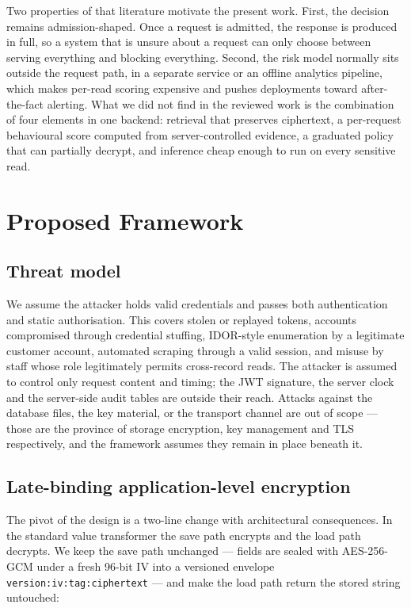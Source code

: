 \documentclass[a4paper,conference]{IEEEtran}
\begin{document}
Two properties of that literature motivate the present work. First, the decision remains
admission-shaped. Once a request is admitted, the response is produced in full, so a system that
is unsure about a request can only choose between serving everything and blocking everything.
Second, the risk model normally sits outside the request path, in a separate service or an
offline analytics pipeline, which makes per-read scoring expensive and pushes deployments toward
after-the-fact alerting. What we did not find in the reviewed work is the combination of four
elements in one backend: retrieval that preserves ciphertext, a per-request behavioural score
computed from server-controlled evidence, a graduated policy that can partially decrypt, and
inference cheap enough to run on every sensitive read.

\section{Proposed Framework}

\subsection{Threat model}

We assume the attacker holds valid credentials and passes both authentication and static
authorisation. This covers stolen or replayed tokens, accounts compromised through credential
stuffing, IDOR-style enumeration by a legitimate customer account, automated scraping through a
valid session, and misuse by staff whose role legitimately permits cross-record reads. The
attacker is assumed to control only request content and timing; the JWT signature, the server
clock and the server-side audit tables are outside their reach. Attacks against the database
files, the key material, or the transport channel are out of scope --- those are the province of
storage encryption, key management and TLS respectively, and the framework assumes they remain
in place beneath it.

\subsection{Late-binding application-level encryption}

The pivot of the design is a two-line change with architectural consequences. In the standard
value transformer the save path encrypts and the load path decrypts. We keep the save path
unchanged --- fields are sealed with AES-256-GCM under a fresh 96-bit IV into a versioned
envelope \texttt{version:iv:tag:ciphertext} --- and make the load path return the stored string
untouched:
\end{document}
